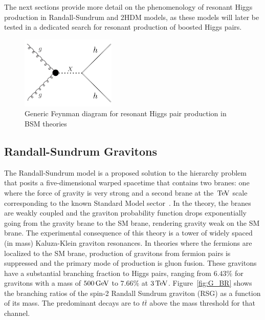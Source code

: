 %
The next sections provide more detail on the phenomenology of resonant Higgs production in Randall-Sundrum and 2HDM models, as these models will later be tested in a dedicated search for resonant production of boosted Higgs pairs. 
%
\begin{figure}[h!]
  \centering
  \captionsetup{justification=centering}

  \includegraphics[width=0.4\textwidth]{figures/Generic_res}
   \caption{Generic Feynman diagram for resonant Higgs pair production in BSM theories}
  \label{fig:HH_res}
\end{figure}
%

\subsection{Randall-Sundrum Gravitons}

The Randall-Sundrum model is a proposed solution to the hierarchy problem that posits a five-dimensional warped spacetime that contains two branes: one where the force of gravity is very strong and a second brane at the $\TeV$ scale corresponding to the known Standard Model sector~\cite{RSG1}. In the theory, the branes are weakly coupled and the graviton probability function drops exponentially going from the gravity brane to the SM brane, rendering gravity weak on the SM brane. The experimental consequence of this theory is a tower of widely spaced (in mass) Kaluza-Klein graviton resonances. In theories where the fermions are localized to the SM brane, production of gravitons from fermion pairs is suppressed and the primary mode of production is gluon fusion\cite{RSG_LHC}. These gravitons have a substantial branching fraction to Higgs pairs, ranging from $6.43$\% for gravitons with a mass of $500 \GeV$ to $7.66\%$ at $3 \TeV$. Figure~\ref{fig:G_BR} shows the branching ratios of the spin-2 Randall Sundrum graviton (RSG) as a function of its mass. The predominant decays are to $t\bar{t}$ above the mass threshold for that channel. 

